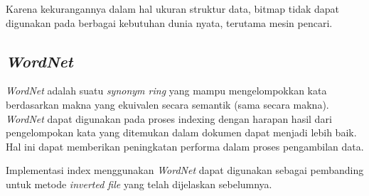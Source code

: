 Karena kekurangannya dalam hal ukuran struktur data, bitmap tidak dapat
digunakan pada berbagai kebutuhan dunia nyata, terutama mesin pencari.

\subsection{\emph{WordNet}}

\emph{WordNet} adalah suatu \emph{synonym ring} yang mampu mengelompokkan kata
berdasarkan makna yang ekuivalen secara semantik (sama secara makna).
\emph{WordNet} dapat digunakan pada proses indexing dengan harapan hasil dari
pengelompokan kata yang ditemukan dalam dokumen dapat menjadi lebih baik. Hal
ini dapat memberikan peningkatan performa dalam proses pengambilan data.

Implementasi index menggunakan \emph{WordNet} dapat digunakan sebagai pembanding
untuk metode \emph{inverted file} yang telah dijelaskan sebelumnya.
